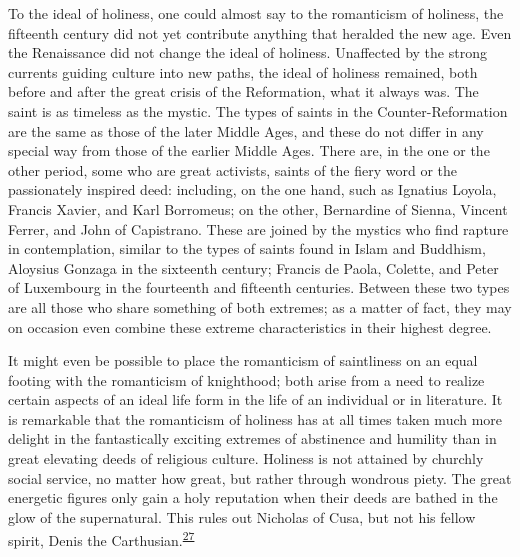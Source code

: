 To the ideal of holiness, one could almost say to the romanticism of
holiness, the fifteenth century did not yet contribute anything that
heralded the new age. Even the Renaissance did not change the ideal of
holiness. Unaffected by the strong currents guiding culture into new
paths, the ideal of holiness remained, both before and after the great
crisis of the Reformation, what it always was. The saint is as timeless
as the mystic. The types of saints in the Counter-Reformation are the
same as those of the later Middle Ages, and these do not differ in any
special way from those of the earlier Middle Ages. There are, in the one
or the other period, some who are great activists, saints of the fiery
word or the passionately inspired deed: including, on the one hand, such
as Ignatius Loyola, Francis Xavier, and Karl Borromeus; on the other,
Bernardine of Sienna, Vincent Ferrer, and John of Capistrano. These are
joined by the mystics who find rapture in contemplation, similar to the
types of saints found in Islam and Buddhism, Aloysius Gonzaga in the
sixteenth century; Francis de Paola, Colette, and Peter of Luxembourg in
the fourteenth and fifteenth centuries. Between
\protect\hypertarget{14_Chapter_Seven__THE_PIOUS_PERSONA.xhtmlux5cux23page_211}{}{}these
two types are all those who share something of both extremes; as a
matter of fact, they may on occasion even combine these extreme
characteristics in their highest degree.

It might even be possible to place the romanticism of saintliness on an
equal footing with the romanticism of knighthood; both arise from a need
to realize certain aspects of an ideal life form in the life of an
individual or in literature. It is remarkable that the romanticism of
holiness has at all times taken much more delight in the fantastically
exciting extremes of abstinence and humility than in great elevating
deeds of religious culture. Holiness is not attained by churchly social
service, no matter how great, but rather through wondrous piety. The
great energetic figures only gain a holy reputation when their deeds are
bathed in the glow of the supernatural. This rules out Nicholas of Cusa,
but not his fellow spirit, Denis the
Carthusian.\textsuperscript{\protect\hypertarget{14_Chapter_Seven__THE_PIOUS_PERSONA.xhtmlux5cux23id_970}{\protect\hyperlink{23_NOTES.xhtmlux5cux23id_971}{27}}}

